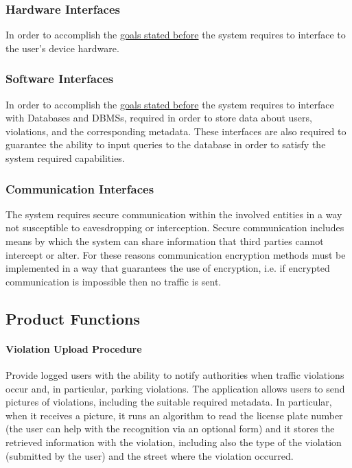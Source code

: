 \subsubsection{Hardware Interfaces}
\label{sec:hardwareinterfaces}
	In order to accomplish the \hyperref[sec:goals]{goals stated before} the system requires to interface to the user's device hardware. 

\subsubsection{Software Interfaces}
	In order to accomplish the \hyperref[sec:goals]{goals stated before} the system requires to interface with Databases and DBMSs, required in order to store data about users, violations, and the corresponding metadata. These interfaces are also required to guarantee the ability to input queries to the database in order to satisfy the system required capabilities.
	
\subsubsection{Communication Interfaces}
	The system requires secure communication within the involved entities in a way not susceptible to eavesdropping or interception. Secure communication includes means by which the system can share information that third parties cannot intercept or alter. For these reasons communication encryption methods must be implemented in a way that guarantees the use of encryption, i.e. if encrypted communication is impossible then no traffic is sent.

\subsection{Product Functions}
\paragraph{Violation Upload Procedure} 
Provide logged users with the ability to notify authorities when traffic violations occur and, in particular, parking violations. The application allows users to send pictures of violations, including the suitable required metadata. In particular, when it receives a picture, it runs an algorithm to read the license plate number (the user can help with the recognition via an optional form) and it stores the retrieved information with the violation, including also the type of the violation (submitted by the user) and the street where the violation occurred. \cite{Assignments}

